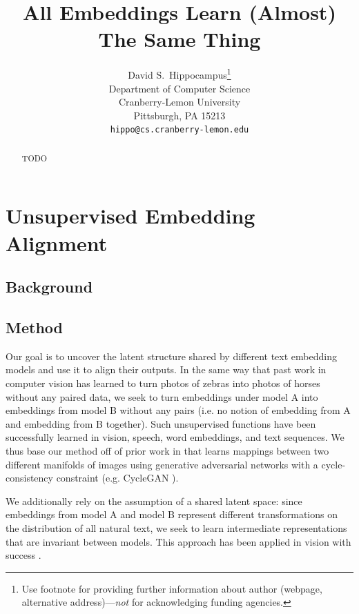 \documentclass{article}
\title{All Embeddings Learn (Almost) The Same Thing}
\author{%
  David S.~Hippocampus\thanks{Use footnote for providing further information
    about author (webpage, alternative address)---\emph{not} for acknowledging
    funding agencies.} \\
  Department of Computer Science\\
  Cranberry-Lemon University\\
  Pittsburgh, PA 15213 \\
  \texttt{hippo@cs.cranberry-lemon.edu} \\
}
\begin{document}
\maketitle


\begin{abstract}
TODO
\end{abstract}





\section{Unsupervised Embedding Alignment}

\subsection{Background}

\subsection{Method}

Our goal is to uncover the latent structure shared by different text embedding models and use it to align their outputs. In the same way that past work in computer vision \citep{huang2018multimodalunsupervisedimagetoimagetranslation, liu2018unsupervisedimagetoimagetranslationnetworks,zhu2020unpairedimagetoimagetranslationusing} has learned to turn photos of zebras into photos of horses without any paired data, we seek to turn embeddings under model A into embeddings from model B without any pairs (i.e. no notion of embedding from A and embedding from B together). Such unsupervised functions have been successfully learned in vision, speech, word embeddings, and text sequences. We thus base our method off of prior work in  that learns mappings between two different manifolds of images using generative adversarial networks with a cycle-consistency constraint (e.g. CycleGAN \citep{zhu2020unpairedimagetoimagetranslationusing}).



We additionally rely on the assumption of a shared latent space: since embeddings from model A and model B represent different transformations on the distribution of all natural text, we seek to learn intermediate representations that are invariant between models. This approach has been applied in vision with success \citep{liu2018unsupervisedimagetoimagetranslationnetworks}.
\end{document}
